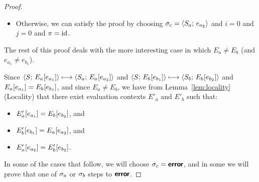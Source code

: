 \begin{proof}
\begin{itemize}
    Both $\conf_a$ and $\conf_b$ can step to this configuration by
    {\sc E-Spawn-Handler}: if the step from $\conf$ to $\conf_a$
    handles $d_2$ then the step from $\conf_a$ to $\conf_c$ handles
    $d'_2$, while if the step from $\conf$ to $\conf_b$ handles $d'_2$
    then the step from $\conf_b$ to $\conf_c$ handles $d_2$.

    The store in the final configuration is $S_a$ or $S_b$, which are
    equal because {\sc E-Spawn-Handler} does not affect the store, and
    we can satisfy the proof by choosing $i = 1$ and $j = 0$ and $\pi
    = \id$.

  \item Otherwise, we can satisfy the proof by choosing $\sigma_c =
    \langle S_a;\, e_{a_2} \rangle$ and $i = 0$ and $j = 0$ and $\pi = \id$.
  \end{itemize}

  The rest of this proof deals with the more interesting case in which
  $E_a \neq E_b$ (and $e_{a_1} \neq e_{b_1}$).

  Since $\langle S;\, E_a\hspace{-0.5mm}\left[e_{a_1}\right] \rangle \longmapsto
  \langle S_a;\, E_a\hspace{-0.5mm}\left[e_{a_2}\right] \rangle$ and
  $\langle S;\, E_b\hspace{-0.5mm}\left[e_{b_1}\right] \rangle \longmapsto
  \langle S_b;\, E_b\hspace{-0.5mm}\left[e_{b_2}\right] \rangle$ and $E_a\hspace{-0.5mm}\left[e_{a_1}\right]
  = E_b\hspace{-0.5mm}\left[e_{b_1}\right]$, and since $E_a \neq E_b$, we have from
  Lemma~\ref{lem:locality} (Locality) that there exist evaluation
  contexts $E'_a$ and $E'_b$ such that:

  \begin{itemize}
  \item $E'_a\hspace{-0.5mm}\left[e_{a_1}\right] = E_b\hspace{-0.5mm}\left[e_{b_2}\right]$, and
  \item $E'_b\hspace{-0.5mm}\left[e_{b_1}\right] = E_a\hspace{-0.5mm}\left[e_{a_2}\right]$, and
  \item $E'_a\hspace{-0.5mm}\left[e_{a_2}\right] =
    E'_b\hspace{-0.5mm}\left[e_{b_2}\right]$.
  \end{itemize}

  In some of the cases that follow, we will choose $\sigma_c = \textbf{\textsf{error}}$,
  and in some we will prove that one of $\conf_a$ or $\conf_b$ steps
  to $\textbf{\textsf{error}}$.


\end{proof}
